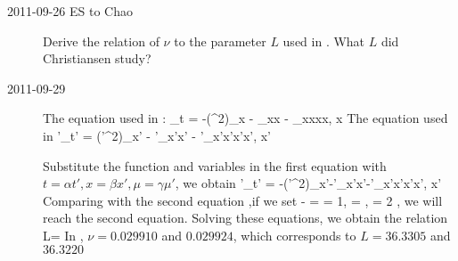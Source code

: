 \begin{description}\label{VarKSe}

\item[2011-09-26 ES to Chao] Derive the relation of $\nu$ to the parameter
$L$ used in . What $L$ did Christiansen \etal{}
study?

\item[2011-09-29]                                               \toCB
The equation used in :
\beq
\mu_t = -(\mu^2)_x - \mu_{xx} - \mu_{xxxx}, x \in [0,L]
\eeq
The equation used in \etal{}
\beq
\mu'_{t'} = (\mu'^2)_{x'} - \mu'_{x'x'} - \nu\mu'_{x'x'x'x'}, x' \in [0,2\pi]
\eeq

Substitute the function and variables in the first equation with $t=\alpha t', x=\beta x', \mu=\gamma \mu'$,
we obtain
\beq
{}\mu'_{t'} = -\frac{\gamma}{\beta}(\mu'^2)_{x'}-\mu'_{x'x'}-\mu'_{x'x'x'x'}, x' 
\eeq
Comparing with the second equation ,if we set
\beq
-\frac{\alpha\gamma}{\beta} =  = 1,
   = \nu,    = 2\pi
\eeq, we will reach the second equation. Solving these equations, we obtain the relation
\beq L=\frac{2\pi}{\sqrt{\nu}}\eeq
In , $\nu = 0.029910$ and $0.029924$, which corresponds to $L = 36.3305$ and $36.3220$

\end{description}
